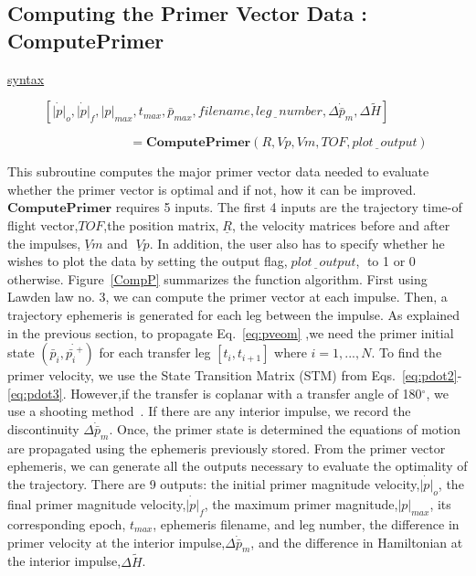 \documentclass[12pt]{report}
\begin{document}
\subsection{Computing the Primer Vector Data : ComputePrimer}
\begin{description}
\item[\underline{syntax}]$[ \dot{|p|}_{o}, \dot{|p|}_{f}, |p|_{max}, t_{max}, \bar p_{max}, filename, leg\underline{\;\;}number, \Delta \dot{\bar p}_{m}, \Delta \tilde{H} ]$
\item[]$\; \; \; \; \; \; \; \; \; \; \; \;\;\;\;\;\;\;\;\;\;\;\;\; = \textbf{ComputePrimer}(R, Vp, Vm, TOF,plot\underline{\;\;}output)$
\end{description}

\noindent This subroutine computes the major primer vector data
needed to evaluate whether the primer vector is optimal and if
not, how it can be improved. $\textbf{ComputePrimer}$ requires 5
inputs. The first 4 inputs are the trajectory time-of flight
vector,$TOF$,the position matrix,$\;\underline{R}$, the velocity
matrices before and after the impulses,$\;\underline{V}m$ and
$\;\underline{V}p$. In addition, the user also has to specify
whether he wishes to plot the data by setting the output flag,$\;
plot\underline{\;\;}output $,$\;$ to 1 or 0 otherwise.
Figure~\ref{CompP} summarizes the function algorithm. First using
Lawden law no. 3, we can compute the primer vector at each
impulse. Then, a trajectory ephemeris is generated for each leg
between the impulse. As explained in the previous section, to
propagate Eq.~\ref{eq:pveom} ,we need the primer initial state
$(\bar p_{i}, \dot{\bar {p_{i}}^{+}})$ for each transfer leg
$[t_{i},t_{i+1}]$ where $i=1,...,N$. To find the primer velocity,
we use the State Transition Matrix (STM) from
Eqs.~\ref{eq:pdot2}-\ref{eq:pdot3}. However,if the transfer is
coplanar with a transfer angle of 180$^{\circ}$, we use a shooting
method~\cite{Guzman01}. If there are any interior impulse, we
record the discontinuity $ \Delta \dot{\bar p}_{m}$. Once, the
primer state is determined the equations of motion are propagated
using the ephemeris previously stored. From the primer vector
ephemeris, we can generate all the outputs necessary to evaluate
the optimality of the trajectory. There are 9 outputs: the initial
primer magnitude velocity,$\dot{|p|}_{o}$, the final primer
magnitude velocity,$\dot{|p|}_{f}$, the maximum primer
magnitude,$|p|_{max}$, its corresponding epoch, $t_{max}$,
ephemeris filename, and leg number, the difference in primer
velocity at the interior impulse,$\Delta \dot{\bar p}_{m}$, and
the difference in Hamiltonian at the interior impulse,$\Delta
\tilde{H}$.
\end{document}
